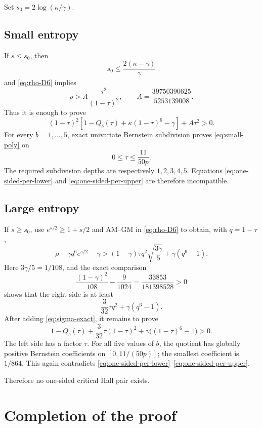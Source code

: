 \documentclass[11pt]{article}
\theoremstyle{definition}
\newcommand{\g}{\gamma}
\begin{document}
Set $s_0=2\log(\kappa/\g)$.

\subsection{Small entropy}

If $s\le s_0$, then
\[
 s_0\le\frac{2(\kappa-\g)}{\g}
\]
and \eqref{eq:rho-D6} implies
\begin{equation}\label{eq:Aenergy}
 \rho>A\frac{\tau^2}{(1-\tau)^2},
 \qquad
 A=\frac{39750390625}{5253139008}.
\end{equation}
Thus it is enough to prove
\begin{equation}\label{eq:small-poly}
 (1-\tau)^2
 \left[1-Q_b(\tau)+\kappa(1-\tau)^6-\g\right]
 +A\tau^2>0.
\end{equation}
For every $b=1,\ldots,5$, exact univariate Bernstein subdivision proves
\eqref{eq:small-poly} on
\[
 0\le\tau\le\frac{11}{50p}.
\]
The required subdivision depths are respectively $1,2,3,4,5$.
Equations \eqref{eq:one-sided-per-lower} and
\eqref{eq:one-sided-per-upper} are therefore incompatible.

\subsection{Large entropy}

If $s\ge s_0$, use $e^{s/2}\ge1+s/2$ and AM--GM in
\eqref{eq:rho-D6} to obtain, with $q=1-\tau$,
\[
 \rho+\g q^6e^{s/2}-\g
 > (1-\g)\tau q^2\sqrt{\frac{3\g}{5}}
   +\g(q^6-1).
\]
Here $3\g/5=1/108$, and the exact comparison
\[
 \frac{(1-\g)^2}{108}-\frac9{1024}
 =\frac{33853}{181398528}>0
\]
shows that the right side is at least
\[
 \frac3{32}\tau q^2+\g(q^6-1).
\]
After adding \eqref{eq:sigma-exact}, it remains to prove
\begin{equation}\label{eq:large-poly}
 1-Q_b(\tau)+\frac3{32}\tau(1-\tau)^2
 +\g\bigl((1-\tau)^6-1\bigr)>0.
\end{equation}
The left side has a factor $\tau$.  For all five values of $b$, the quotient
has globally positive Bernstein coefficients on
$[0,11/(50p)]$; the smallest coefficient is $1/864$.  This again contradicts
\eqref{eq:one-sided-per-lower}--\eqref{eq:one-sided-per-upper}.

Therefore no one-sided critical Hall pair exists.

\section{Completion of the proof}
\end{document}
